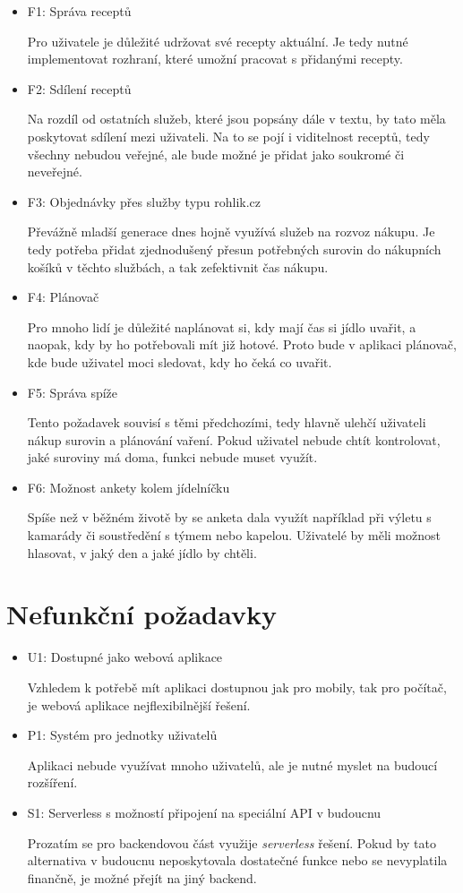 \begin{itemize}
    \item F1: Správa receptů

    Pro uživatele je důležité udržovat své recepty aktuální. Je tedy nutné implementovat rozhraní, které umožní pracovat s
    přidanými recepty.
    \item F2: Sdílení receptů

    Na rozdíl od ostatních služeb, které jsou popsány dále v textu, by tato měla poskytovat sdílení mezi uživateli. Na to se pojí i
    viditelnost receptů, tedy všechny nebudou veřejné, ale bude možné je přidat jako soukromé či neveřejné.
    \item F3: Objednávky přes služby typu rohlik.cz

    Převážně mladší generace dnes hojně využívá služeb na rozvoz nákupu. Je tedy potřeba přidat zjednodušený přesun potřebných
    surovin do nákupních košíků v těchto službách, a tak zefektivnit čas nákupu.
    \item F4: Plánovač

    Pro mnoho lidí je důležité naplánovat si, kdy mají čas si jídlo uvařit, a naopak, kdy by ho potřebovali mít již hotové. Proto bude v
    aplikaci plánovač, kde bude uživatel moci sledovat, kdy ho čeká co uvařit.
    \item F5: Správa spíže

    Tento požadavek souvisí s těmi předchozími, tedy hlavně ulehčí uživateli nákup surovin a plánování vaření. Pokud uživatel nebude chtít
    kontrolovat, jaké suroviny má doma, funkci nebude muset využít.
    \item F6: Možnost ankety kolem jídelníčku

    Spíše než v běžném životě by se anketa dala využít například při výletu s kamarády či soustředění s týmem nebo kapelou. Uživatelé
    by měli možnost hlasovat, v jaký den a jaké jídlo by chtěli.
\end{itemize}

\section{Nefunkční požadavky}

\begin{itemize}
    \item U1: Dostupné jako webová aplikace

    Vzhledem k potřebě mít aplikaci dostupnou jak pro mobily, tak pro počítač, je webová aplikace nejflexibilnější řešení.
    \item P1: Systém pro jednotky uživatelů

    Aplikaci nebude využívat mnoho uživatelů, ale je nutné myslet na budoucí rozšíření.
    \item S1: Serverless s možností připojení na speciální API v budoucnu

    Prozatím se pro backendovou část využije \emph{serverless} řešení. Pokud by tato alternativa v budoucnu neposkytovala dostatečné
    funkce nebo se nevyplatila finančně, je možné přejít na jiný backend.
\end{itemize}

